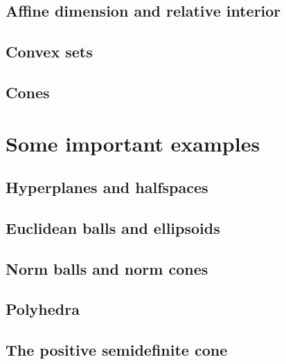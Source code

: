 \subsection{Affine dimension and relative interior}
\begin{example}
\end{example}

\subsection{Convex sets}

\subsection{Cones}

\section{Some important examples}

\subsection{Hyperplanes and halfspaces}

\subsection{Euclidean balls and ellipsoids}

\subsection{Norm balls and norm cones}
\begin{example}
\end{example}

\subsection{Polyhedra}
\begin{example}
\end{example}
\begin{example}
\end{example}

\subsection{The positive semidefinite cone}
\begin{example}
\end{example}

